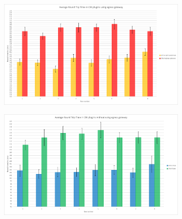 \begin{figure}[H]
    \centering
    \begin{subfigure}[b]{0.45\textwidth}
        \includegraphics[width=\textwidth]{plots/egress/rtt_egress.png}
        \caption{}
        \label{fig:rtt_a}
    \end{subfigure}
    \hfill
    \begin{subfigure}[b]{0.45\textwidth}
        \includegraphics[width=\textwidth]{plots/egress/rtt_base.png}
        \caption{}
        \label{fig:rtt_b}
    \end{subfigure}
    
    \vspace{10pt}
    

\end{figure}
